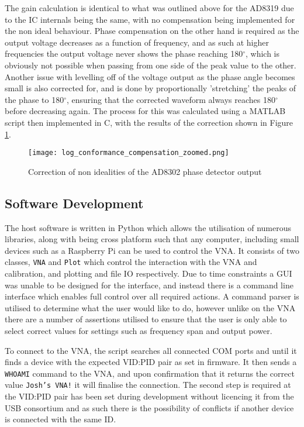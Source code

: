 The gain calculation is identical to what was outlined above for the AD8319 due to the IC internals being the same, with no compensation being implemented for the non ideal behaviour. Phase compensation on the other hand is required as the output voltage decreases as a function of frequency, and as such at higher frequencies the output voltage never shows the phase reaching 180$^\circ$, which is obviously not possible when passing from one side of the peak value to the other. Another issue with levelling off of the voltage output as the phase angle becomes small is also corrected for, and is done by proportionally 'stretching' the peaks of the phase to 180$^\circ$, ensuring that the corrected waveform always reaches 180$^\circ$ before decreasing again. The process for this was calculated using a MATLAB script then implemented in C, with the results of the correction shown in Figure \ref{fig:phase_comp}.

\begin{figure}[H]
	\centering
	\texttt{[image: log\_conformance\_compensation\_zoomed.png]}
	\caption{Correction of non idealities of the AD8302 phase detector output}
	\label{fig:phase_comp}
\end{figure}

\subsection{Software Development}
The host software is written in Python which allows the utilisation of numerous libraries, along with being cross platform such that any computer, including small devices such as a Raspberry Pi can be used to control the VNA. It consists of two classes, \texttt{VNA} and \texttt{Plot} which control the interaction with the VNA and calibration, and plotting and file IO respectively. Due to time constraints a GUI was unable to be designed for the interface, and instead there is a command line interface which enables full control over all required actions. A command parser is utilised to determine what the user would like to do, however unlike on the VNA there are a number of assertions utilised to ensure that the user is only able to select correct values for settings such as frequency span and output power. 

To connect to the VNA, the script searches all connected COM ports and until it finds a device with the expected VID:PID pair as set in firmware. It then sends a \texttt{WHOAMI} command to the VNA, and upon confirmation that it returns the correct value \texttt{Josh's VNA!} it will finalise the connection. The second step is required at the VID:PID pair has been set during development without licencing it from the USB consortium and as such there is the possibility of conflicts if another device is connected with the same ID. 

